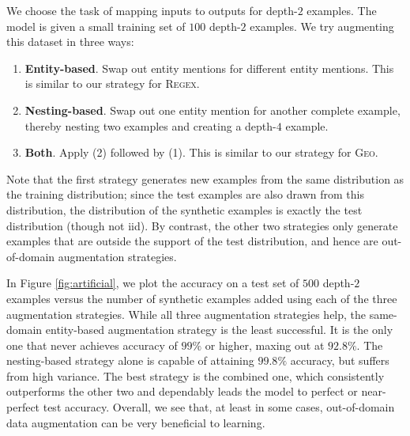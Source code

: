 \documentclass[11pt,letterpaper]{article}
\newcommand{\regex}{\textsc{Regex}\xspace}
\newcommand{\geo}{\textsc{Geo}\xspace}
\begin{document}
We choose the task of mapping inputs to outputs for depth-$2$ examples.
The model is given a small training set of $100$ depth-$2$ examples.
We try augmenting this dataset in three ways:
\begin{enumerate}
  \item \textbf{Entity-based}.  
    Swap out entity mentions for different entity mentions.
    This is similar to our strategy for \regex.
  \item \textbf{Nesting-based}.  
    Swap out one entity mention for another complete example,
    thereby nesting two examples and creating a depth-$4$ example.
  \item \textbf{Both}.  
    Apply (2) followed by (1).
    This is similar to our strategy for \geo.
\end{enumerate}
Note that the first strategy generates new examples
from the same distribution as the training distribution;
since the test examples are also drawn from this distribution,
the distribution of the synthetic examples is exactly the test distribution
(though not iid).
By contrast, the other two strategies only generate examples that are
outside the support of the test distribution,
and hence are out-of-domain augmentation strategies.

In Figure \ref{fig:artificial}, we plot the accuracy on a test set 
of $500$ depth-$2$ examples versus the number of synthetic examples added
using each of the three augmentation strategies.
While all three augmentation strategies help,
the same-domain entity-based augmentation strategy is the least successful.
It is the only one that never achieves accuracy of $99\%$ or higher,
maxing out at $92.8\%$.
The nesting-based strategy alone is capable of attaining
$99.8\%$ accuracy, but suffers from high variance.
The best strategy is the combined one, which 
consistently outperforms the other two and 
dependably leads the model to perfect or near-perfect test accuracy.
Overall, we see that, at least in some cases,
out-of-domain data augmentation can be very beneficial
to learning.
\end{document}
